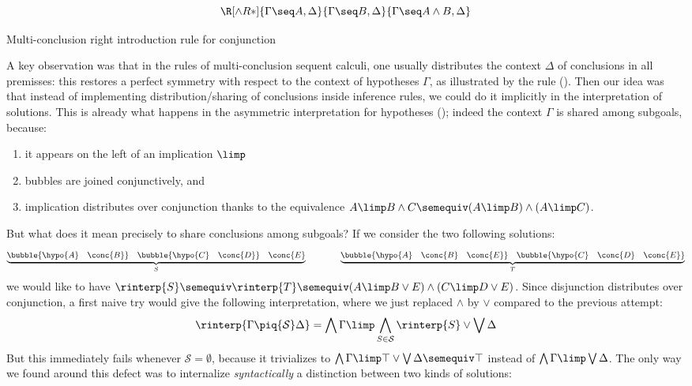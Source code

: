 \begin{marginfigure}
  $$
  \R[\land R*]
    {\Gamma \seq A, \Delta}
    {\Gamma \seq B, \Delta}
    {\Gamma \seq A \land B, \Delta}
  $$
  \caption{Multi-conclusion right introduction rule for conjunction}
\end{marginfigure}

A key observation was that in the rules of multi-conclusion sequent calculi, one
usually distributes the context $\Delta$ of conclusions in all premisses: this
restores a perfect symmetry with respect to the context of hypotheses $\Gamma$,
as illustrated by the {} rule (). Then our
idea was that instead of implementing distribution/sharing of conclusions inside
inference rules, we could do it implicitly in the interpretation of solutions.
This is already what happens in the asymmetric interpretation for hypotheses
(); indeed the context $\Gamma$ is shared among subgoals,
because:
\begin{enumerate}
  \item it appears on the left of an implication $\limp$
  \item bubbles are joined conjunctively, and
  \item implication distributes over conjunction thanks to the equivalence $A
  \limp B \land C \semequiv (A \limp B) \land (A \limp C)$.
\end{enumerate}
But what does it mean precisely to share conclusions among subgoals? If we
consider the two following solutions:
$$
\underbrace{\bubble{\hypo{A}~~~\conc{B}}~~~\bubble{\hypo{C}~~~\conc{D}}~~~\conc{E}}_{S} \qquad\qquad
\underbrace{\bubble{\hypo{A}~~~\conc{B}~~~\conc{E}}~~~\bubble{\hypo{C}~~~\conc{D}~~~\conc{E}}}_{T}
$$
we would like to have $\rinterp{S} \semequiv \rinterp{T} \semequiv (A \limp B
\lor E) \land (C \limp D \lor E)$. Since disjunction distributes over
conjunction, a first naive try would give the following interpretation, where we
just replaced $\land$ by $\lor$ compared to the previous attempt:
$$
\rinterp{\Gamma \piq{\mathcal{S}} \Delta} =
\bigwedge{\Gamma} \limp \bigwedge_{S \in \mathcal{S}}{\rinterp{S}} \lor \bigvee \Delta
$$
But this immediately fails whenever $\mathcal{S} = \emptyset$, because it
trivializes to $\bigwedge \Gamma \limp \top \lor \bigvee \Delta \semequiv \top$
instead of $\bigwedge \Gamma \limp \bigvee \Delta$. The only way we found around
this defect was to internalize \emph{syntactically} a distinction between two
kinds of solutions:
